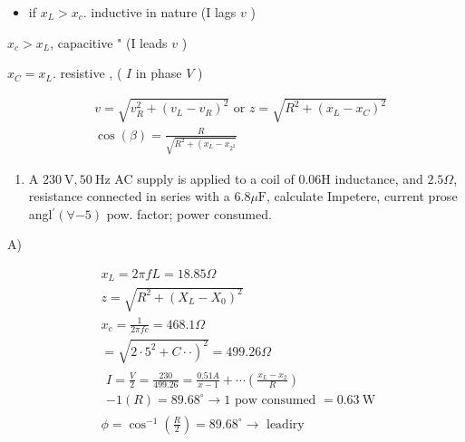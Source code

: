 \documentclass[12pt, a4paper]{article}
\begin{document}
	\begin{itemize}
		\item if $x_{L}>x_{c}$. inductive in nature (I lags $v$ )
	\end{itemize}

$x_{c}>x_{L}$, capacitive " (I leads $v$ )

$x_{C}=x_{L}$. resistive , ( $I$ in phase $V$ )

	$$
		\begin{aligned}
			 & v=\sqrt{v_{R}^{2}+\left(v_{L}-v_{R}\right)^{2}} \text { or } z=\sqrt{R^{2}+\left(x_{L}-x_{C}\right)^{2}} \\
			 & \cos (\beta)=\frac{R}{\sqrt{R^{2}+\left(x_{L}-x_{2^{2}}\right.}}
		\end{aligned}
	$$

	\begin{enumerate}
		\item A $230 \mathrm{~V}, 50 \mathrm{~Hz}$ AC supply is applied to a coil of $0.06 \mathrm{H}$ inductance, and $2.5 \Omega$, resistance connected in series with a $6.8 \mu \mathrm{F}$, calculate Impetere, current prose angl$^{\prime}(\forall-5)$ pow. factor; power consumed.
	\end{enumerate}

	A)

	$$
		\begin{aligned}
			 & x_{L}=2 \pi f L=18.85 \Omega                                                                                                                                 \\
			 & z=\sqrt{R^{2}+\left(X_{L}-X_{0}\right)^{2}}                                                                                                                  \\
			 & x_{c}=\frac{1}{2 \pi f c}=468.1 \Omega                                                                                                                       \\
			 & =\sqrt{\left.2 \cdot 5^{2}+C \cdot \cdot\right)^{2}}=499.26 \Omega                                                                                           \\
			 & \begin{array}{l}
				   I=\frac{V}{2}=\frac{230}{499.26}=\frac{0.51 A}{x-1}+\cdots\left(\frac{x_{L}-x_{2}}{R}\right) \\
				   -1(R)=89.68^{\circ} \rightarrow 1 \text { pow consumed }=0.63 \mathrm{~W}
			   \end{array} \\
			 & \phi=\cos ^{-1}\left(\frac{R}{2}\right)=89.68^{\circ} \rightarrow \text { leadiry }
		\end{aligned}
	$$
\end{document}
